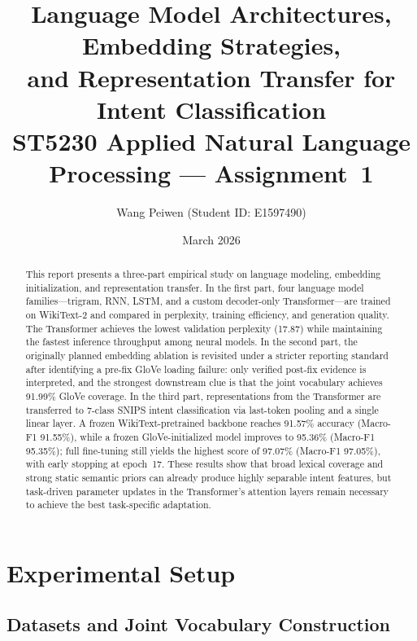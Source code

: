 \documentclass[10pt,a4paper]{article}
\title{%
    \textbf{Language Model Architectures, Embedding Strategies,\\
    and Representation Transfer for Intent Classification}\\[0.8ex]
    \large ST5230 Applied Natural Language Processing --- Assignment~1%
}
\author{Wang Peiwen \quad (Student ID: E1597490)}
\date{March 2026}
\begin{document}
\raggedbottom
\maketitle

\begin{abstract}
\noindent
This report presents a three-part empirical study on language modeling, embedding initialization, and representation transfer.
In the first part, four language model families---trigram, RNN, LSTM, and a custom decoder-only Transformer---are trained on WikiText-2 and compared in perplexity, training efficiency, and generation quality.
The Transformer achieves the lowest validation perplexity (17.87) while maintaining the fastest inference throughput among neural models.
In the second part, the originally planned embedding ablation is revisited under a stricter reporting standard after identifying a pre-fix GloVe loading failure: only verified post-fix evidence is interpreted, and the strongest downstream clue is that the joint vocabulary achieves 91.99\% GloVe coverage.
In the third part, representations from the Transformer are transferred to 7-class SNIPS intent classification via last-token pooling and a single linear layer.
A frozen WikiText-pretrained backbone reaches 91.57\% accuracy (Macro-F1 91.55\%), while a frozen GloVe-initialized model improves to 95.36\% (Macro-F1 95.35\%); full fine-tuning still yields the highest score of 97.07\% (Macro-F1 97.05\%), with early stopping at epoch~17.
These results show that broad lexical coverage and strong static semantic priors can already produce highly separable intent features, but task-driven parameter updates in the Transformer's attention layers remain necessary to achieve the best task-specific adaptation.
\end{abstract}

\section{Experimental Setup}
\label{sec:setup}

\subsection{Datasets and Joint Vocabulary Construction}
\label{sec:data}
\end{document}

